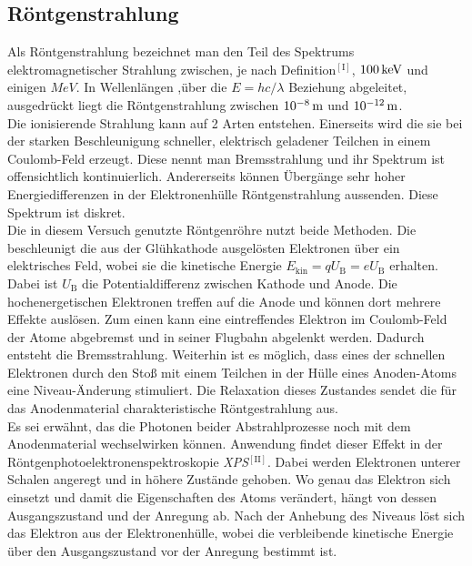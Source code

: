 \documentclass[numbers=noenddot,12pt,a4paper]{scrartcl}
\newcommand{\ix}[1]{_\text{#1}}
\newcommand{\tilt}[1]{\textit{#1}}
\begin{document}
\subsection{Röntgenstrahlung}
Als Röntgenstrahlung bezeichnet man den Teil des Spektrums elektromagnetischer Strahlung zwischen, je nach Definition$^{\left[\text{I}\right]}$, $\unit[100]{keV}$ und einigen $\unit{MeV}$. In Wellenlängen ,über die $E=hc/\lambda$ Beziehung abgeleitet, ausgedrückt liegt die Röntgenstrahlung zwischen $\unit[10^{-8}]{m}$ und $\unit[10^{-12}]{m}$.\\
Die ionisierende Strahlung kann auf 2 Arten entstehen. Einerseits wird die sie bei der starken Beschleunigung schneller, elektrisch geladener Teilchen in einem  Coulomb-Feld erzeugt. Diese nennt man Bremsstrahlung und ihr Spektrum ist offensichtlich kontinuierlich. Andererseits können Übergänge sehr hoher Energiedifferenzen in der Elektronenhülle Röntgenstrahlung aussenden. Diese Spektrum ist diskret.\\
Die in diesem Versuch genutzte Röntgenröhre nutzt beide Methoden. Die beschleunigt die aus der Glühkathode ausgelösten Elektronen über ein elektrisches Feld, wobei sie die kinetische Energie $E\ix{kin}=qU\ix{B}=eU\ix{B}$ erhalten. Dabei ist $U\ix{B}$ die Potentialdifferenz zwischen Kathode und Anode. Die hochenergetischen Elektronen treffen auf die Anode und können dort mehrere Effekte auslösen. Zum einen kann eine eintreffendes Elektron im Coulomb-Feld der Atome abgebremst und in seiner Flugbahn abgelenkt werden. Dadurch entsteht die Bremsstrahlung. Weiterhin ist es möglich, dass eines der schnellen Elektronen durch den Stoß mit einem Teilchen in der Hülle eines Anoden-Atoms eine Niveau-Änderung stimuliert. Die Relaxation dieses Zustandes sendet die für das Anodenmaterial charakteristische Röntgestrahlung aus.\\
Es sei erwähnt, das die Photonen beider Abstrahlprozesse noch mit dem Anodenmaterial wechselwirken können. Anwendung findet dieser Effekt in der Röntgenphotoelektronenspektroskopie \tilt{XPS}$^{\left[\text{II}\right]}$. Dabei werden Elektronen unterer Schalen angeregt und in höhere Zustände gehoben. Wo genau das Elektron sich einsetzt und damit die Eigenschaften des Atoms verändert, hängt von dessen Ausgangszustand und der Anregung ab. Nach der Anhebung des Niveaus löst sich das Elektron aus der Elektronenhülle, wobei die verbleibende kinetische Energie über den Ausgangszustand vor der Anregung bestimmt ist.
\newpage
\end{document}
